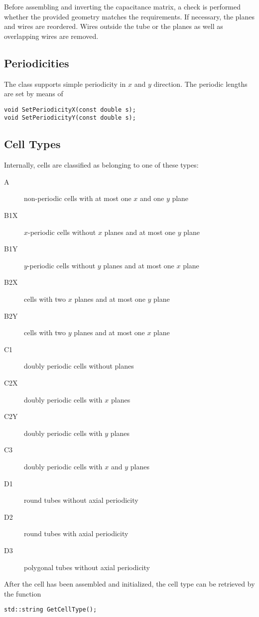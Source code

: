Before assembling and inverting the capacitance matrix, 
a check is performed whether the provided geometry matches the requirements.
If necessary, the planes and wires are reordered. 
Wires outside the tube or the planes as well as overlapping wires are removed.

\subsection{Periodicities}
The class supports simple periodicity in \(x\) and \(y\) direction.
The periodic lengths are set by means of
\begin{lstlisting}
void SetPeriodicityX(const double s);
void SetPeriodicityY(const double s);
\end{lstlisting}

\subsection{Cell Types}

Internally, cells are classified as belonging to one of these types:
\begin{description}
  \item[A]
  non-periodic cells with at most one \(x\) and one \(y\) plane
  \item[B1X]
  \(x\)-periodic cells without \(x\) planes and at most one \(y\) plane
  \item[B1Y]
  \(y\)-periodic cells without \(y\) planes and at most one \(x\) plane
  \item[B2X]
  cells with two \(x\) planes and at most one \(y\) plane
  \item[B2Y]
  cells with two \(y\) planes and at most one \(x\) plane
  \item[C1]
  doubly periodic cells without planes
  \item[C2X]
  doubly periodic cells with \(x\) planes
  \item[C2Y]
  doubly periodic cells with \(y\) planes
  \item[C3]
  doubly periodic cells with \(x\) and \(y\) planes
  \item[D1]
  round tubes without axial periodicity
  \item[D2]
  round tubes with axial periodicity
  \item[D3]
  polygonal tubes without axial periodicity
\end{description}

After the cell has been assembled and initialized, the cell type can be 
retrieved by the function
\begin{lstlisting}
std::string GetCellType();
\end{lstlisting}

